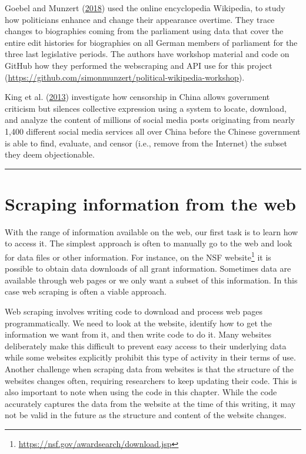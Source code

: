 \documentclass[]{krantz}
\begin{document}
Goebel and Munzert (\protect\hyperlink{ref-Goebel2018}{2018}) used the
online encyclopedia Wikipedia, to study how politicians enhance and
change their appearance overtime. They trace changes to biographies
coming from the parliament using data that cover the entire edit
histories for biographies on all German members of parliament for the
three last legislative periods. The authors have workshop material and
code on GitHub how they performed the webscraping and API use for this
project
(\url{https://github.com/simonmunzert/political-wikipedia-workshop}).

King et al. (\protect\hyperlink{ref-King2013}{2013}) investigate how
censorship in China allows government criticism but silences collective
expression using a system to locate, download, and analyze the content
of millions of social media posts originating from nearly 1,400
different social media services all over China before the Chinese
government is able to find, evaluate, and censor (i.e., remove from the
Internet) the subset they deem objectionable.

\begin{center}\rule{0.5\linewidth}{\linethickness}\end{center}

\section{Scraping information from the
web}\label{scraping-information-from-the-web}

With the range of information available on the web, our first task is to
learn how to access it. The simplest approach is often to manually go to
the web and look for data files or other information. For instance, on
the NSF website\footnote{\url{https://nsf.gov/awardsearch/download.jsp}}
it is possible to obtain data downloads of all grant information.
Sometimes data are available through web pages or we only want a subset
of this information. In this case web scraping is often a viable
approach.

Web scraping involves writing code to download and process web pages
programmatically. We need to look at the website, identify how to get
the information we want from it, and then write code to do it. Many
websites deliberately make this difficult to prevent easy access to
their underlying data while some websites explicitly prohibit this type
of activity in their terms of use. Another challenge when scraping data
from websites is that the structure of the websites changes often,
requiring researchers to keep updating their code. This is also
important to note when using the code in this chapter. While the code
accurately captures the data from the website at the time of this
writing, it may not be valid in the future as the structure and content
of the website changes.
\end{document}
